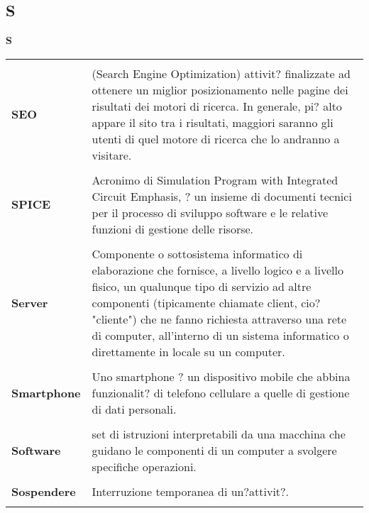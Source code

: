 {\subsection{S} 
\hfill\Huge{\textbf{S}} \\ 
\normalsize 
\begin{longtabu} to 
\toprule \\ 
\textbf{SEO} & (Search Engine Optimization) attivit? finalizzate ad ottenere un miglior posizionamento nelle pagine dei risultati dei motori di ricerca. In generale, pi? alto appare il sito tra i risultati, maggiori saranno gli utenti di quel motore di ricerca che lo andranno a visitare. \\ 
 \\ 
\textbf{SPICE} & Acronimo di Simulation Program with Integrated Circuit Emphasis, ? un insieme di documenti tecnici per il processo di sviluppo software e le relative funzioni di gestione delle risorse. \\ 
 \\ 
\textbf{Server} & Componente o sottosistema informatico di elaborazione che fornisce, a livello logico e a livello fisico, un qualunque tipo di servizio ad altre componenti (tipicamente chiamate client, cio? "cliente") che ne fanno richiesta attraverso una rete di computer, all'interno di un sistema informatico o direttamente in locale su un computer. \\ 
 \\ 
\textbf{Smartphone} & Uno smartphone ? un dispositivo mobile che abbina funzionalit? di telefono cellulare a quelle di gestione di dati personali. \\ 
 \\ 
\textbf{Software} & set di istruzioni interpretabili da una macchina che guidano le componenti di un computer a svolgere specifiche operazioni. \\ 
 \\ 
\textbf{Sospendere} & Interruzione temporanea di un?attivit?. \\ 
 \\ 
\end{longtabu} 
\newpage 
}
